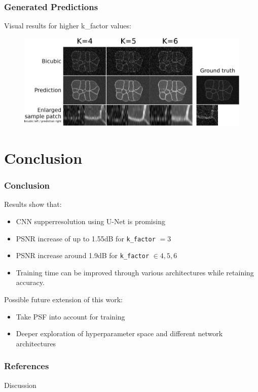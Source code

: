 \documentclass{beamer}
\begin{document}
\begin{frame}
    \frametitle{Generated Predictions}
    Visual results for higher k\_factor values:
    \begin{figure}
        \includegraphics[width=1\columnwidth]{../report/figures/prediction_pres.pdf}
    \end{figure}
\end{frame}

\section{Conclusion}

\begin{frame}
    \frametitle{Conclusion}
    Results show that:
    \begin{itemize}
        \item CNN supperresolution using U-Net is promising
        \item PSNR increase of up to 1.55dB for \texttt{k\_factor} $=3$
        \item PSNR increase around 1.9dB for \texttt{k\_factor} $\in {4, 5, 6}$
        \item Training time can be improved through various architectures while retaining accuracy.
    \end{itemize}

    Possible future extension of this work:
    \begin{itemize}
        \item Take PSF into account for training
        \item Deeper exploration of hyperparameter space and different network architectures
    \end{itemize}
\end{frame}

\begin{frame}
    \frametitle{References}
    
    
\end{frame}


\begin{frame}
    \Huge{\centerline{Discussion}}
\end{frame}

\end{document}
